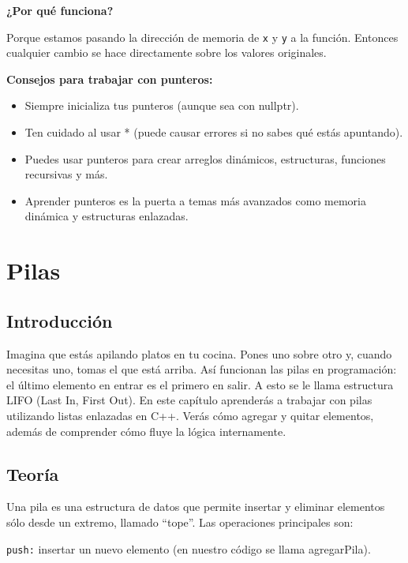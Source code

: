 \documentclass[
  11pt,
  a4paper,
  DIV=11,
  numbers=noendperiod]{scrreprt}
\begin{document}
\textbf{¿Por qué funciona?}

Porque estamos pasando la dirección de memoria de \texttt{x} y
\texttt{y} a la función. Entonces cualquier cambio se hace directamente
sobre los valores originales.

\textbf{Consejos para trabajar con punteros:}

\begin{itemize}
\item
  Siempre inicializa tus punteros (aunque sea con nullptr).
\item
  Ten cuidado al usar * (puede causar errores si no sabes qué estás
  apuntando).
\item
  Puedes usar punteros para crear arreglos dinámicos, estructuras,
  funciones recursivas y más.
\item
  Aprender punteros es la puerta a temas más avanzados como memoria
  dinámica y estructuras enlazadas.
\end{itemize}


\chapter{Pilas}\label{pilas}

\section{Introducción}\label{introducciuxf3n-1}

Imagina que estás apilando platos en tu cocina. Pones uno sobre otro y,
cuando necesitas uno, tomas el que está arriba. Así funcionan las pilas
en programación: el último elemento en entrar es el primero en salir. A
esto se le llama estructura LIFO (Last In, First Out). En este capítulo
aprenderás a trabajar con pilas utilizando listas enlazadas en C++.
Verás cómo agregar y quitar elementos, además de comprender cómo fluye
la lógica internamente.

\section{Teoría}\label{teoruxeda}

Una pila es una estructura de datos que permite insertar y eliminar
elementos sólo desde un extremo, llamado ``tope''. Las operaciones
principales son:

\texttt{push:} insertar un nuevo elemento (en nuestro código se llama
agregarPila).
\end{document}
